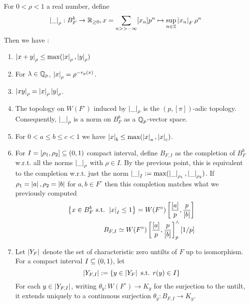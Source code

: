 \documentclass{article}
\begin{document}
\begin{prop}
  
  For $0 < \rho < 1$ a real number, define \[
    \left\vert \_ \right\vert_\rho : B^b_{F} \to \mathbb{R}_{\geq 0} , 
    x = \sum_{n >> -\infty} [x_n] p^n 
    \mapsto \sup_{n \in \mathbb{Z}} \left\vert x_n \right\vert_F \rho^n
  \]
  Then we have : 
  \begin{enumerate}
    \item \cite[Prop. 1.4.3]{FF18} 
      $\left\vert x + y \right\vert_\rho \leq \max(\left\vert x \right\vert_\rho , \left\vert y \right\vert_\rho)$
    \item \cite[Remark 1.4.4]{FF18} 
      For $\lambda \in \mathbb{Q}_p$, $\left\vert x \right\vert_\rho = \rho^{- v_p(x)}$.
    \item \cite[Prop. 1.4.9]{FF18} 
      $\left\vert x y \right\vert_\rho = \left\vert x \right\vert_\rho \left\vert y \right\vert_\rho$.  
    \item \cite[Prop. 1.4.11.(3)]{FF18}
      The topology on $W(F^\circ)$ induced by $\left\vert \_ \right\vert_\rho$
      is the $(p , [\pi])$-adic topology.
      Consequently, $\left\vert \_ \right\vert_\rho$ is a norm on 
      $B^b_F$ as a $\mathbb{Q}_p$-vector space.
    \item For $0 < a \leq b \leq c < 1$ we have 
      $\left\vert x \right\vert_b \leq \max(\left\vert x \right\vert_a , \left\vert x \right\vert_c)$.
    \item \cite[Example 1.6.3]{FF18} 
      For $I = [\rho_1 , \rho_2] \subseteq (0,1)$ compact interval,
      define $B_{F , I}$ as the completion of $B^b_F$ w.r.t.
      all the norms $\left\vert \_ \right\vert_\rho$ with $\rho \in I$.
      By the previous point, this is equivalent to the completion
      w.r.t. just the norm 
      $\left\vert \_ \right\vert_I := \max(\left\vert \_ \right\vert_{\rho_1} , \left\vert \_ \right\vert_{\rho_2})$.
      If $\rho_1 = \left\vert a \right\vert , \rho_2 = \left\vert b \right\vert$ for $a , b \in F^\circ$
      then this completion matches what we previously computed
      \begin{align*}
        \left\{x \in B^b_F \text{ s.t. } \left\vert x \right\vert_I \leq 1\right\} = 
          W(F^\circ)\left[\frac{[a]}{p} , \frac{p}{[b]}\right] \\
        B_{F , I} \simeq 
          W(F^\circ)\left[\frac{[a]}{p} , \frac{p}{[b]}\right]^\wedge_p[1 / p]
      \end{align*}
      \item \cite[Lem. 2.4.7, 2.4.8]{FF18}
      Let $\left\vert Y_{F} \right\vert$ 
      denote the set of characteristic zero untilts of $F$ up to isomorphism.
      For a compact interval $I \subseteq (0,1)$,
      let \[
        \left\vert Y_{F , I} \right\vert := \left\{y \in \left\vert Y_F \right\vert\text{ s.t. } r(y) \in I\right\}
      \]
      For each $y \in \left\vert Y_{F , I} \right\vert$,
      writing $\theta_y : W(F^\circ) \to K_y$ for the surjection
      to the untilt, it extends uniquely
      to a continuous surjection $\theta_y : B_{F , I} \to K_y$.

\end{enumerate}
\end{prop}
\end{document}
